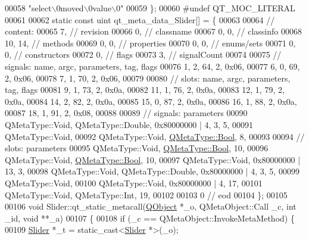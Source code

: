 \begin{DoxyCode}
00058     \textcolor{stringliteral}{"select\(\backslash\)0moved\(\backslash\)0value\(\backslash\)0"}
00059 \};
00060 \textcolor{preprocessor}{#undef QT\_MOC\_LITERAL}
00061 
00062 \textcolor{keyword}{static} \textcolor{keyword}{const} uint qt\_meta\_data\_Slider[] = \{
00063 
00064  \textcolor{comment}{// content:}
00065        7,       \textcolor{comment}{// revision}
00066        0,       \textcolor{comment}{// classname}
00067        0,    0, \textcolor{comment}{// classinfo}
00068       10,   14, \textcolor{comment}{// methods}
00069        0,    0, \textcolor{comment}{// properties}
00070        0,    0, \textcolor{comment}{// enums/sets}
00071        0,    0, \textcolor{comment}{// constructors}
00072        0,       \textcolor{comment}{// flags}
00073        3,       \textcolor{comment}{// signalCount}
00074 
00075  \textcolor{comment}{// signals: name, argc, parameters, tag, flags}
00076        1,    2,   64,    2, 0x06,
00077        6,    0,   69,    2, 0x06,
00078        7,    1,   70,    2, 0x06,
00079 
00080  \textcolor{comment}{// slots: name, argc, parameters, tag, flags}
00081        9,    1,   73,    2, 0x0a,
00082       11,    1,   76,    2, 0x0a,
00083       12,    1,   79,    2, 0x0a,
00084       14,    2,   82,    2, 0x0a,
00085       15,    0,   87,    2, 0x0a,
00086       16,    1,   88,    2, 0x0a,
00087       18,    1,   91,    2, 0x08,
00088 
00089  \textcolor{comment}{// signals: parameters}
00090     QMetaType::Void, QMetaType::Double, 0x80000000 | 4,    3,    5,
00091     QMetaType::Void,
00092     QMetaType::Void, \hyperlink{a00004_a76a8b016e5ad61faf9062cc387df5016}{QMetaType::Bool},    8,
00093 
00094  \textcolor{comment}{// slots: parameters}
00095     QMetaType::Void, \hyperlink{a00004_a76a8b016e5ad61faf9062cc387df5016}{QMetaType::Bool},   10,
00096     QMetaType::Void, \hyperlink{a00004_a76a8b016e5ad61faf9062cc387df5016}{QMetaType::Bool},   10,
00097     QMetaType::Void, 0x80000000 | 13,    3,
00098     QMetaType::Void, QMetaType::Double, 0x80000000 | 4,    3,    5,
00099     QMetaType::Void,
00100     QMetaType::Void, 0x80000000 | 4,   17,
00101     QMetaType::Void, QMetaType::Int,   19,
00102 
00103        0        \textcolor{comment}{// eod}
00104 \};
00105 
00106 \textcolor{keywordtype}{void} Slider::qt\_static\_metacall(\hyperlink{a00059}{QObject} *\_o, QMetaObject::Call \_c, \textcolor{keywordtype}{int} \_id, \textcolor{keywordtype}{void} **\_a)
00107 \{
00108     \textcolor{keywordflow}{if} (\_c == QMetaObject::InvokeMetaMethod) \{
00109         \hyperlink{a00077}{Slider} *\_t = \textcolor{keyword}{static\_cast<}\hyperlink{a00077}{Slider} *\textcolor{keyword}{>}(\_o);

\end{DoxyCode}
